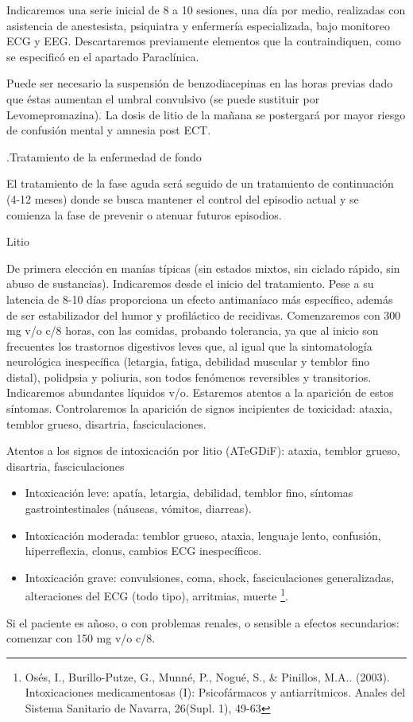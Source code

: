 Indicaremos una serie inicial de 8 a 10 sesiones, una día por medio, realizadas con asistencia de anestesista, psiquiatra y enfermería especializada, bajo monitoreo ECG y EEG. Descartaremos previamente elementos que la contraindiquen, como se especificó en el apartado Paraclínica.

Puede ser necesario la suspensión de benzodiacepinas en las horas previas dado que éstas aumentan el umbral convulsivo (se puede sustituir por Levomepromazina). La dosis de litio de la mañana se postergará por mayor riesgo de confusión mental y amnesia post ECT.

.Tratamiento de la enfermedad de fondo

El tratamiento de la fase aguda será seguido de un tratamiento de continuación (4-12 meses) donde se busca mantener el control del episodio actual y se comienza la fase de prevenir o atenuar futuros episodios.

\faPills Litio

De primera elección en manías típicas (sin estados mixtos, sin ciclado rápido, sin abuso de sustancias). Indicaremos desde el inicio del tratamiento. Pese a su latencia de 8-10 días proporciona un efecto antimaníaco más específico, además de ser estabilizador del humor y profiláctico de recidivas. Comenzaremos con 300 mg v/o c/8 horas, con las comidas, probando tolerancia, ya que al inicio son frecuentes los trastornos digestivos leves que, al igual que la sintomatología neurológica inespecífica (letargia, fatiga, debilidad muscular y temblor fino distal), polidpsia y poliuria, son todos fenómenos reversibles y transitorios. Indicaremos abundantes líquidos v/o. Estaremos atentos a la aparición de estos síntomas. Controlaremos la aparición de signos incipientes de toxicidad: ataxia, temblor grueso, disartria, fasciculaciones.

\faRadiation Atentos a los signos de intoxicación por litio (ATeGDiF): ataxia, temblor grueso, disartria, fasciculaciones
\begin{itemize}
	\item Intoxicación leve: apatía, letargia, debilidad, temblor fino, síntomas gastrointestinales (náuseas, vómitos, diarreas).
	\item Intoxicación moderada: temblor grueso, ataxia, lenguaje lento, confusión, hiperreflexia, clonus, cambios ECG inespecíficos.
	\item Intoxicación grave: convulsiones, coma, shock, fasciculaciones generalizadas, alteraciones del ECG (todo tipo), arritmias, muerte \footnote{Osés, I., Burillo-Putze, G., Munné, P., Nogué, S., \& Pinillos, M.A.. (2003). Intoxicaciones medicamentosas (I): Psicofármacos y antiarrítmicos. Anales del Sistema Sanitario de Navarra, 26(Supl. 1), 49-63}.
\end{itemize}
Si el paciente es añoso, o con problemas renales, o sensible a efectos secundarios: comenzar con 150 mg v/o c/8.


